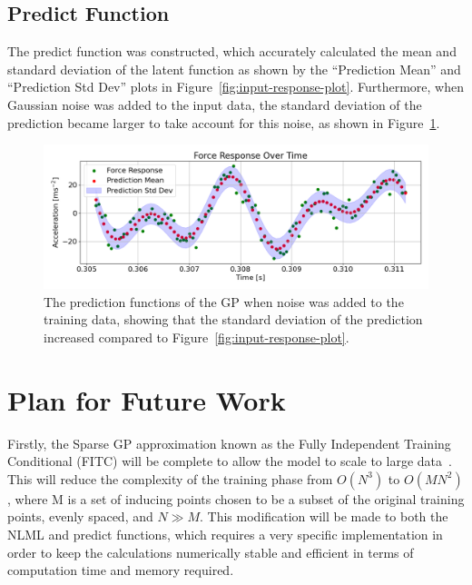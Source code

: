 \documentclass[12pt]{article}
\begin{document}
    \subsection{Predict Function}
    The predict function was constructed, which accurately calculated the mean and standard deviation of the latent function as shown by the ``Prediction Mean'' and ``Prediction Std Dev'' plots in Figure~\ref{fig:input-response-plot}.
    Furthermore, when Gaussian noise was added to the input data, the standard deviation of the prediction became larger to take account for this noise, as shown in Figure~\ref{fig:input-response-noise}.


    \begin{figure}[ht]
        \centering
        \includegraphics[width=1.0\linewidth]{figures/input-response-noise/input-response-noise.png}
        \caption{The prediction functions of the GP when noise was added to the training data, showing that the standard deviation of the prediction increased compared to Figure~\ref{fig:input-response-plot}.}
        \label{fig:input-response-noise}
    \end{figure}

    \section{Plan for Future Work}
    Firstly, the Sparse GP approximation known as the Fully Independent Training Conditional (FITC) will be complete to allow the model to scale to large data~\cite{q-candela}.
    This will reduce the complexity of the training phase from $O(N^3)$ to $O(MN^2)$, where M is a set of inducing points chosen to be a subset of the original training points, evenly spaced, and $N \gg M$.  
    This modification will be made to both the NLML and predict functions, which requires a very specific implementation in order to keep the calculations numerically stable and efficient in terms of computation time and memory required.
\end{document}
